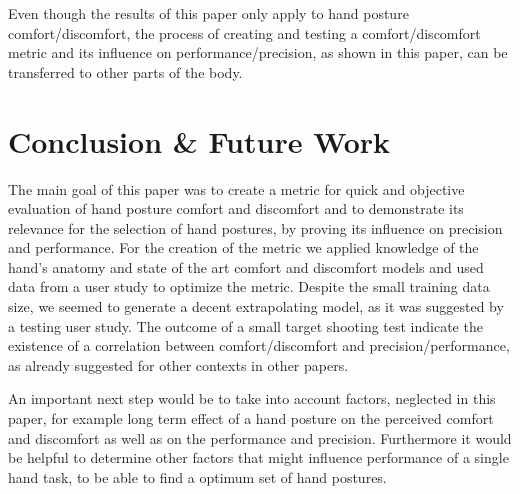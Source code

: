 \documentclass{sig-alternate-05-2015}
\begin{document}
Even though the results of this paper only apply to hand posture comfort/discomfort, the process of creating and testing a comfort/discomfort metric and its influence on performance/precision, as shown in this paper, can be transferred to other parts of the body. 

\section{Conclusion \& Future Work}

The main goal of this paper was to create a metric for quick and objective evaluation of hand posture comfort and discomfort and to demonstrate its relevance for the selection of hand postures, by proving its influence on precision and performance. For the creation of the metric we applied knowledge of the hand's anatomy and state of the art comfort and discomfort models and used data from a user study to optimize the metric. Despite the small training data size, we seemed to generate a decent extrapolating model, as it was suggested by a testing user study. The outcome of a small target shooting test indicate the existence of a correlation between comfort/discomfort and precision/performance, as already suggested for other contexts in other papers.

An important next step would be to take into account factors, neglected in this paper, for example long term effect of a hand posture on the perceived comfort and discomfort as well as on the performance and precision. Furthermore it would be helpful to determine other factors that might influence performance of a single hand task, to be able to find a optimum set of hand postures.

%

%
%

\end{document}
